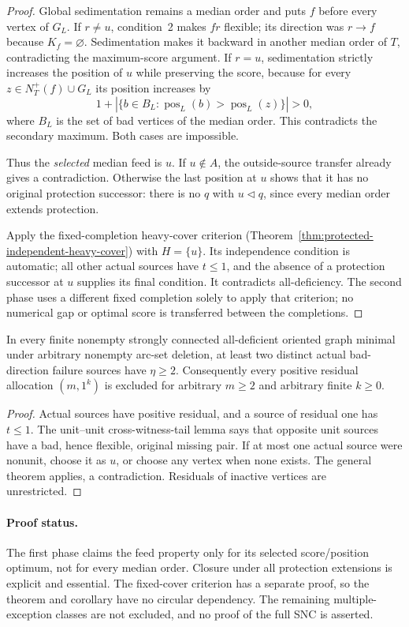 \begin{proof}
Global sedimentation remains a median order and puts $f$ before every
vertex of $G_L$. If $r\ne u$, condition~2 makes $fr$ flexible; its
direction was $r\to f$ because $K_f=\varnothing$. Sedimentation
makes it backward in another median order of $T$, contradicting the
maximum-score argument. If $r=u$, sedimentation strictly increases
the position of $u$ while preserving the score, because for every
$z\in N_T^+(f)\cup G_L$ its position increases by
\[
 1+|\{b\in B_L:\operatorname{pos}_L(b)>
                            \operatorname{pos}_L(z)\}|>0,
\]
where $B_L$ is the set of bad vertices of the median order.
This contradicts the secondary maximum. Both cases are impossible.

Thus the \emph{selected} median feed is $u$. If $u\notin A$, the
outside-source transfer already gives a contradiction. Otherwise the
last position at $u$ shows that it has no original protection successor:
there is no $q$ with $u\triangleleft q$, since every median order
extends protection.

Apply the fixed-completion heavy-cover criterion
(Theorem~\ref{thm:protected-independent-heavy-cover}) with
$H=\{u\}$. Its independence condition is automatic; all other actual
sources have $t\le1$, and the absence of a protection successor at $u$
supplies its final condition. It contradicts all-deficiency.
The second phase uses a different fixed completion solely to apply
that criterion; no numerical gap or optimal score is transferred
between the completions.
\end{proof}

\begin{corollary}
\label{cor:one-exception-short-two-heavy}
In every finite nonempty strongly connected all-deficient oriented
graph minimal under arbitrary nonempty arc-set deletion, at least two
distinct actual bad-direction failure sources have $\eta\ge2$.
Consequently every positive residual allocation $(m,1^k)$ is excluded
for arbitrary $m\ge2$ and arbitrary finite $k\ge0$.
\end{corollary}
\begin{proof}
Actual sources have positive residual, and a source of residual one
has $t\le1$. The unit--unit cross-witness-tail lemma says
that opposite unit sources have a bad, hence flexible, original missing
pair. If at most one actual source were nonunit, choose it as $u$,
or choose any vertex when none exists. The general theorem applies,
a contradiction. Residuals of inactive vertices are unrestricted.
\end{proof}

\paragraph{Proof status.}
The first phase claims the feed property only for its selected
score/position optimum, not for every median order. Closure under
all protection extensions is explicit and essential. The fixed-cover
criterion has a separate proof, so the theorem and corollary have no
circular dependency. The remaining multiple-exception classes are
not excluded, and no proof of the full SNC is asserted.
